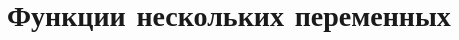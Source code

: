 \documentclass[../main.tex]{subfiles}
\begin{document}
\chapter{Функции нескольких переменных}

\end{document}
